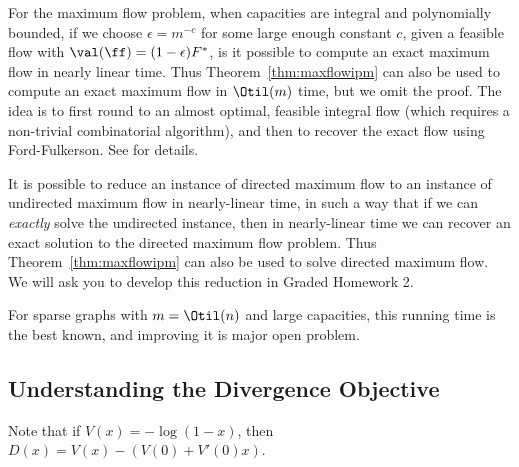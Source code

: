 \begin{remark}
  For the maximum flow problem, when capacities are integral and
  polynomially bounded, if we choose $\epsilon = m^{-c}$ for some
  large enough constant $c$, given a feasible flow with $\val(\ff) =
  (1-\epsilon)F^*$, is it possible to compute an exact maximum flow in
  nearly linear time.
  Thus Theorem~\ref{thm:maxflowipm} can also be used to compute an
  exact maximum flow in $\Otil(m)$ time, but we omit the proof.
  The idea is to first round to an almost optimal, feasible integral flow (which
  requires a non-trivial combinatorial algorithm), and then to recover
  the exact flow using Ford-Fulkerson.
  See \cite{M13} for details.
\end{remark}

\begin{remark}
  It is possible to reduce an instance of directed maximum flow to an
  instance of undirected maximum flow in nearly-linear time, in such a
  way that if we can \emph{exactly} solve the undirected instance,
  then in nearly-linear time we can recover an exact solution to the
  directed maximum flow problem.
  Thus Theorem~\eqref{thm:maxflowipm} can also be used to solve
  directed maximum flow.
  We will ask you to develop this reduction in Graded Homework 2.
\end{remark}

\begin{remark}
  For sparse graphs with $m = \Otil(n)$ and large capacities, this
  running time is the best known, and improving it is major open problem.
\end{remark}

\subsection{Understanding the Divergence Objective}
Note that if $V(x) = -\log(1-x)$, then $D(x) = V(x) - (V(0) + V'(0) x)$.



